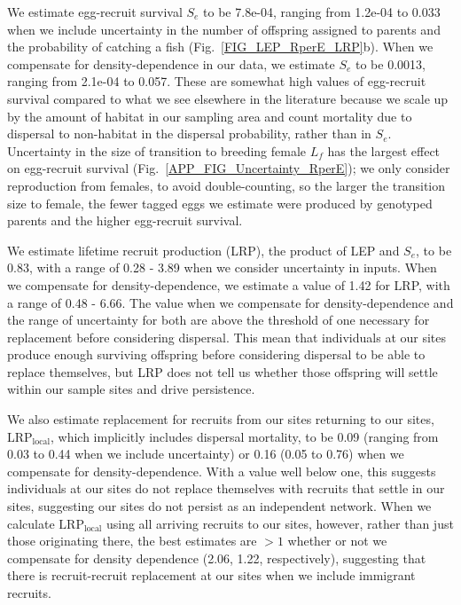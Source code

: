 \documentclass[12pt, oneside]{article}   	%
\begin{document}
We estimate egg-recruit survival $S_e$ to be 7.8e-04, ranging from 1.2e-04 to 0.033 when we include uncertainty in the number of offspring assigned to parents and the probability of catching a fish (Fig.\ \ref{FIG_LEP_RperE_LRP}b). When we compensate for density-dependence in our data, we estimate $S_e$ to be 0.0013, ranging from 2.1e-04 to 0.057. These are somewhat high values of egg-recruit survival compared to what we see elsewhere in the literature \citep[e.g.][]{rumrill_natural_1990, metaxas_quantifying_2009} \citep[though not unreasonable, e.g.][]{white2014planktonic, johnson2018integrating} because we scale up by the amount of habitat in our sampling area and count mortality due to dispersal to non-habitat in the dispersal probability, rather than in $S_e$. Uncertainty in the size of transition to breeding female $L_f$ has the largest effect on egg-recruit survival (Fig.\ \ref{APP_FIG_Uncertainty_RperE}); we only consider reproduction from females, to avoid double-counting, so the larger the transition size to female, the fewer tagged eggs we estimate were produced by genotyped parents and the higher egg-recruit survival. %

We estimate lifetime recruit production (LRP), the product of LEP and $S_e$, to be 0.83, with a range of 0.28 - 3.89 when we consider uncertainty in inputs. When we compensate for density-dependence, we estimate a value of 1.42 for LRP, with a range of 0.48 - 6.66. The value when we compensate for density-dependence and the range of uncertainty for both are above the threshold of one necessary for replacement before considering dispersal. This mean that individuals at our sites produce enough surviving offspring before considering dispersal to be able to replace themselves, but LRP does not tell us whether those offspring will settle within our sample sites and drive persistence. %

We also estimate replacement for recruits from our sites returning to our sites,  $\text{LRP}_\text{local}$, which implicitly includes dispersal mortality, to be 0.09 (ranging from 0.03 to 0.44 when we include uncertainty) or 0.16 (0.05 to 0.76) when we compensate for density-dependence. With a value well below one, this suggests individuals at our sites do not replace themselves with recruits that settle in our sites, suggesting our sites do not persist as an independent network. When we calculate $\text{LRP}_\text{local}$ using all arriving recruits to our sites, however, rather than just those originating there, the best estimates are $> 1$ whether or not we compensate for density dependence (2.06, 1.22, respectively), suggesting that there is recruit-recruit replacement at our sites when we include immigrant recruits.
\end{document}
